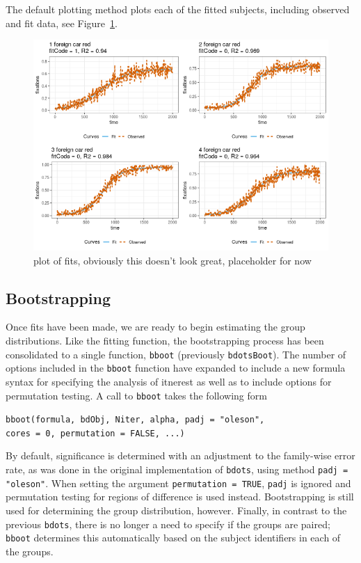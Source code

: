 \documentclass{article}
\newcommand{\xt}{\texttt}%
\begin{document}
The default plotting method plots each of the fitted subjects, including  observed and fit data, see Figure~\ref{fig:plot_fits}.

\begin{figure}[h!]
\centering
\includegraphics[scale=0.65]{img/car_fit.png}
\caption{plot of fits, obviously this doesn't look great, placeholder for now}
\label{fig:plot_fits}
\end{figure}

\subsection{Bootstrapping}

Once fits have been made, we are ready to begin estimating the group distributions. Like the fitting function, the bootstrapping process has been consolidated to a single function, \texttt{bboot} (previously \texttt{bdotsBoot}). The number of options included in the \xt{bboot} function have expanded to include a new formula syntax for specifying the analysis of itnerest as well as to include options for permutation testing. A call to \xt{bboot} takes the following form

\begin{center}
\tt bboot(formula, bdObj, Niter, alpha,   padj = "oleson", \\ cores = 0, permutation = FALSE, ...)
\end{center}

By default, significance is determined with an adjustment to the family-wise error rate, as was done in the original implementation of \xt{bdots}, using method \xt{padj = "oleson"}. When setting the argument \xt{permutation = TRUE}, \xt{padj} is ignored and permutation testing for regions of difference is used instead. Bootstrapping is still used for determining the group distribution, however. Finally, in contrast to the previous \xt{bdots}, there is no longer a need to specify if the groups are paired; \xt{bboot} determines this automatically based on the subject identifiers in each of the groups.
\end{document}
